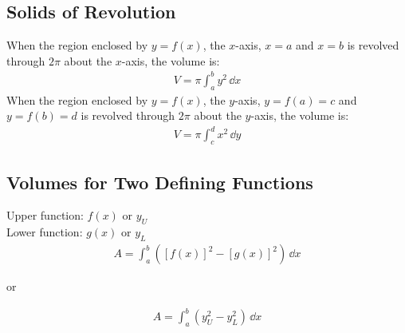 \documentclass[10pt, a4paper, titlepage]{article}
\begin{document}
\begin{multicols*}{3}
	\dotfill
	\subsection{Solids of Revolution}
	When the region enclosed by $y=f(x)$, the $x$-axis, $x=a$ and $x=b$ is revolved through $2\pi$ about the $x$-axis, the volume is:
	\begin{align}
		V=\pi\int_{a}^{b}y^2\,\dd{x}
	\end{align}
	When the region enclosed by $y=f(x)$, the $y$-axis, $y=f(a)=c$ and $y=f(b)=d$ is revolved through $2\pi$ about the $y$-axis, the volume is:
	\begin{align}
		V=\pi\int_{c}^{d}x^2\,\dd{y}
	\end{align}

	\dotfill
	\subsection{Volumes for Two Defining Functions}
	Upper function: $f(x)$ or $y_U$\\
	Lower function: $g(x)$ or $y_L$
	\begin{align}
		A=\int_{a}^{b}\left(\left[f(x)\right]^2-\left[g(x)\right]^2\right)\,\dd{x}
	\end{align}
	\begin{center}
		or
	\end{center}
	\begin{align}
		A=\int_{a}^{b}\left(y_U^2-y_L^2\right)\,\dd{x}
	\end{align}

\end{multicols*}
\end{document}
